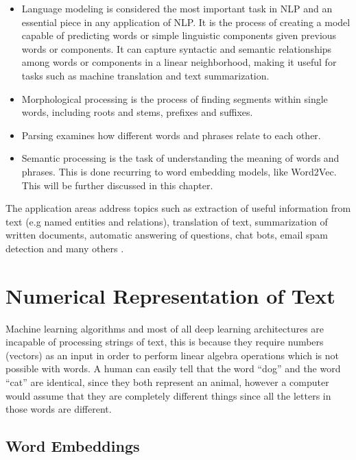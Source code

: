 \begin{itemize}
    \item Language modeling is considered the most important task in NLP and an essential piece in any application of NLP. It is the process of creating a model capable of predicting words or simple linguistic components given previous words or components. It can capture syntactic and semantic relationships among words or components in a linear neighborhood, making it useful for tasks such as machine translation and text summarization.
    \item Morphological processing is the process of finding segments within single words,  including roots and stems, prefixes and suffixes.
    \item Parsing examines how different words and phrases relate to each other.
    \item Semantic processing is the task of understanding the meaning of words and phrases. This is done recurring to  word embedding models, like Word2Vec. This will be further discussed in this chapter.
\end{itemize}





The application areas address topics such as extraction of useful information from text (e.g named entities and relations), translation of text, summarization of written documents, automatic answering of questions, chat bots, email spam detection and many others \cite{Otter2018}.




\section{Numerical Representation of Text}
\label{sec:num}

\par Machine learning algorithms and most of all deep learning architectures are incapable of processing strings of text, this is because they require numbers (vectors) as an input in order to perform linear algebra operations \cite{Vidhya2017} which is not possible with words. A human can easily tell that the word \enquote{dog} and the word \enquote{cat} are identical, since they both represent an animal, however a computer would assume that they are completely different things since all the letters in those  words are different. 

    \subsection{Word Embeddings}

